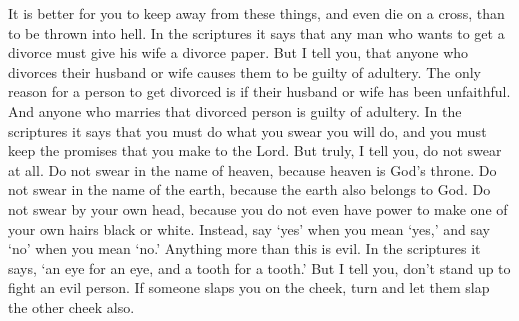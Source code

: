 It is better for you to keep away from these things, and even die on a cross, than to be thrown into hell.
\bverse \iffalse It hath been written, that whosoever shall put away his wife, let him give her a writing of divorcement. \fi
In the scriptures it says that any man who wants to get a divorce must give his wife a divorce paper.
\bverse \iffalse Verily, verily, I say unto you, that whosoever shall put away his wife, saving for the cause of fornication, causeth her to commit adultery; and whoso shall marry her who is divorced committeth adultery. \fi
But I tell you, that anyone who divorces their husband or wife causes them to be guilty of adultery. The only reason for a person to get divorced is if their husband or wife has been unfaithful. And anyone who marries that divorced person is guilty of adultery.
\bverse \iffalse And again it is written, thou shalt not forswear thyself, but shalt perform unto the Lord thine oaths; \fi
In the scriptures it says that you must do what you swear you will do, and you must keep the promises that you make to the Lord.
\bverse \iffalse But verily, verily, I say unto you, swear not at all; neither by heaven, for it is God's throne; \fi
But truly, I tell you, do not swear at all. Do not swear in the name of heaven, because heaven is God's throne.
\bverse \iffalse Nor by the earth, for it is his footstool; \fi
Do not swear in the name of the earth, because the earth also belongs to God.
\bverse \iffalse Neither shalt thou swear by thy head, because thou canst not make one hair black or white; \fi
Do not swear by your own head, because you do not even have power to make one of your own hairs black or white.
\bverse \iffalse But let your communication be Yea, yea; Nay, nay; for whatsoever cometh of more than these is evil. \fi
Instead, say \lq yes\rq{} when you mean \lq yes,\rq{} and say \lq no\rq{} when you mean \lq no.\rq{} Anything more than this is evil.
\bverse \iffalse And behold, it is written, an eye for an eye, and a tooth for a tooth; \fi
In the scriptures it says, \lq an eye for an eye, and a tooth for a tooth.\rq
\bverse \iffalse But I say unto you, that ye shall not resist evil, but whosoever shall smite thee on thy right cheek, turn to him the other also; \fi
But I tell you, don't stand up to fight an evil person. If someone slaps you on the cheek, turn and let them slap the other cheek also.
\bverse \iffalse And if any man will sue thee at the law and take away thy coat, let him have thy cloak also; \fi
